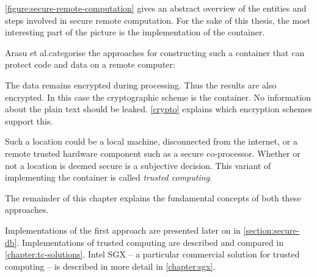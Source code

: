 \autoref{figure:secure-remote-computation} gives an abstract overview of the entities and steps involved in secure remote computation. For the sake of this thesis, the most interesting part of the picture is the implementation of the container.\label{ID_1217277821}

Arasu et al.\@ categorise the approaches for constructing such a container that can protect code and data on a remote computer:\cite[p. 19]{querying-encrypted-data-tutorial}\label{ID_500367217}
\begin{description}\label{ID_27140838}
\item[Compute on encrypted data] The data remains encrypted during processing. Thus the results are also encrypted. In this case the cryptographic scheme is the container. No information about the plain text should be leaked. \autoref{crypto} explains which encryption schemes support this.\label{ID_328666411}
\item[Decrypt and process data in a secure location] Such a location could be a local machine, disconnected from the internet, or a remote trusted hardware component such as a secure co-processor. Whether or not a location is deemed secure is a subjective decision. This variant of implementing the container is called \textit{trusted computing}.\label{ID_481899872}
\end{description}\label{ID_933485978}
The remainder of this chapter explains the fundamental concepts of both these approaches.\label{ID_1721841145}

Implementations of the first approach are presented later on in \autoref{section:secure-db}.\label{ID_1199323088}
Implementations of trusted computing are described and compared in \autoref{chapter:tc-solutions}.\label{ID_684830290}
Intel SGX -- a particular commercial solution for trusted computing -- is described in more detail in \autoref{chapter:sgx}.\label{ID_733461445}


